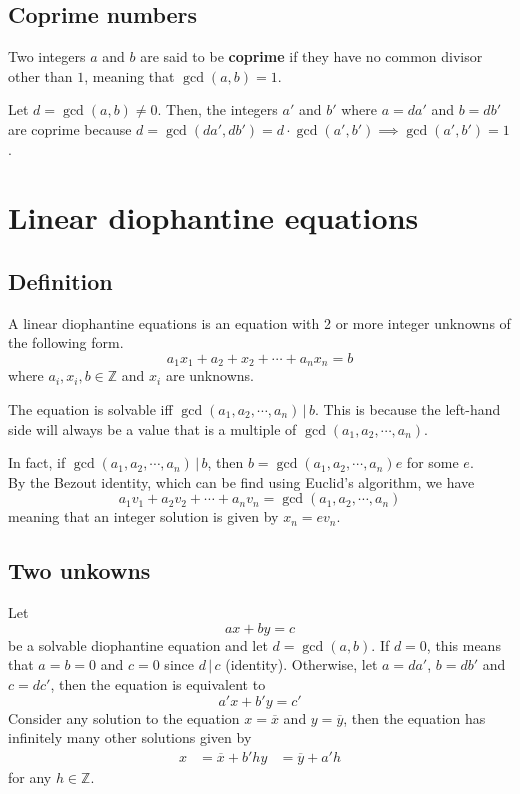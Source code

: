 \documentclass[preview]{standalone}
\newcommand{\divides}{\,|\,}
\begin{document}


\subsection{Coprime numbers}

Two integers \(a\) and \(b\) are said to be \textbf{coprime}
if they have no common divisor other than \(1\), meaning that \(\gcd(a,b)=1\).

Let \(d = \gcd(a, b) \neq 0\). Then, the integers \(a'\) and \(b'\) where \(a = da'\) and \(b = db'\)
are coprime because \(d = \gcd(da', db') = d\cdot \gcd(a', b') \implies \gcd(a', b') = 1\).


\pagebreak

\section{Linear diophantine equations}

\subsection{Definition}

A linear diophantine equations is an equation with 2 or more integer unknowns of the following form.
\[
    a_1x_1 + a_2+x_2 + \cdots + a_nx_n = b
\]
where \(a_i,x_i,b \in \mathbb{Z}\) and \(x_i\) are unknowns.

The equation is solvable iff \(\gcd(a_1,a_2,\cdots,a_n) \divides b\).
This is because the left-hand side will always be a value that is a multiple
of \(\gcd(a_1,a_2,\cdots,a_n)\).

In fact, if \(\gcd(a_1,a_2,\cdots,a_n) \divides b\),
then \(b = \gcd(a_1,a_2,\cdots,a_n)e\) for some \(e\). \\
By the Bezout identity, which can be find using Euclid's algorithm, we have
\[a_1v_1+a_2v_2+\cdots+a_nv_n=\gcd(a_1,a_2,\cdots,a_n)\]
meaning that an integer solution is given by \(x_n=ev_n\).

\subsection{Two unkowns}

Let \[ax+by=c\] be a solvable diophantine equation
and let \(d = \gcd(a,b)\).
If \(d=0\), this means that \(a=b=0\) and \(c=0\) since \(d \divides c\) (identity).
Otherwise, let \(a=da'\), \(b=db'\) and \(c=dc'\), then the equation is equivalent to
\[
    a'x + b'y = c'
\]
Consider any solution to the equation \(x=\overline{x}\) and \(y=\overline{y}\),
then the equation has infinitely many other solutions given by
\begin{align*}
    x &= \overline{x} + b'h
    y &= \overline{y} + a'h
\end{align*}
for any \(h \in \mathbb{Z}\).
\end{document}
